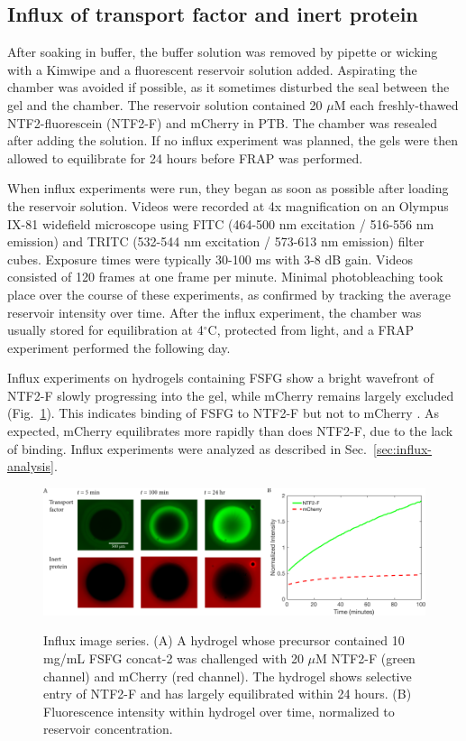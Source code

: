 \subsection{Influx of transport factor and inert protein}
After soaking in buffer, the buffer solution was removed by pipette or wicking with a Kimwipe and a fluorescent reservoir solution added.  Aspirating the chamber was avoided if possible, as it sometimes disturbed the seal between the gel and the chamber.  The reservoir solution contained 20 $\mu$M each freshly-thawed NTF2-fluorescein (NTF2-F) and mCherry in PTB.  The chamber was resealed after adding the solution.  If no influx experiment was planned, the gels were then allowed to  equilibrate for 24 hours before FRAP was performed.

When influx experiments were run, they began as soon as possible after loading the reservoir solution.  Videos were recorded at 4x magnification on an Olympus IX-81 widefield microscope using FITC (464-500 nm excitation / 516-556 nm emission) and TRITC (532-544 nm excitation / 573-613 nm emission) filter cubes.  Exposure times were typically 30-100 ms with 3-8 dB gain.  Videos consisted of 120 frames at one frame per minute. Minimal photobleaching took place over the course of these experiments, as confirmed by tracking the average reservoir intensity over time.  After the influx experiment, the chamber was usually stored for equilibration at 4$^\circ$C, protected from light, and a FRAP experiment performed the following day.

Influx experiments on hydrogels containing FSFG show a bright wavefront  of NTF2-F slowly progressing into the gel, while mCherry remains largely excluded (Fig.~\ref{fig:influx-images}).  This indicates binding of FSFG to NTF2-F but not to mCherry .  As expected, mCherry equilibrates more rapidly than does NTF2-F, due to the lack of binding.  Influx experiments were analyzed as described in Sec.~\ref{sec:influx-analysis}.

\begin{figure}[t!]
\caption[Influx experiments images and accumulation.]{Influx image series.  (A) A hydrogel whose precursor contained 10 mg/mL FSFG concat-2 was challenged with 20 $\mu$M NTF2-F (green channel) and mCherry (red channel).  The hydrogel shows selective entry of NTF2-F and has largely equilibrated within 24 hours. (B) Fluorescence intensity within hydrogel over time, normalized to reservoir concentration.}
\centering
\includegraphics[width=\textwidth]{figs/ch04/influx-images-clean.pdf}
\label{fig:influx-images}
\end{figure} 

